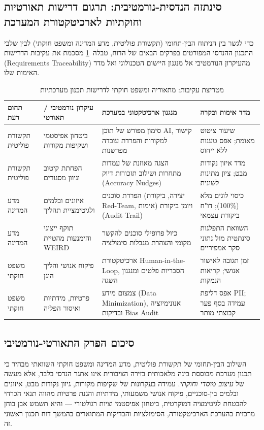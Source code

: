 \subsection{סינתזה הנדסית-נורמטיבית: תרגום דרישות תאורטיות וחוקתיות לארכיטקטורת המערכת}
כדי לגשר בין הניתוח הבין-תחומי (תקשורת פוליטית, מדע המדינה ומשפט חוקתי) לבין שלבי התכנון ההנדסי המפורטים בפרקים הבאים של הדוח, טבלה~\ref{tab:design-traceability} מסכמת את עקיבות הדרישות (Requirements Traceability) מהעיקרון הנורמטיבי אל מנגנון היישום הטכנולוגי ואל מדד האימות שלו.

\begin{table}[htbp]
\centering
\caption{מטריצת עקיבות: מתאוריה ומשפט חוקתי לדרישות תכנון מערכתיות}
\label{tab:design-traceability}
\begin{tabular}{|p{2.8cm}|p{3.6cm}|p{4.3cm}|p{3.8cm}|}
\hline
\textbf{תחום דעת} & \textbf{עיקרון נורמטיבי / תאורטי} & \textbf{מנגנון ארכיטקטוני במערכת} & \textbf{מדד אימות ובקרה} \\
\hline
תקשורת פוליטית & ביטחון אפיסטמי ושקיפות מקורות \cite{kreps2022all, lazer2018science} & סימון מפורש של תוכן AI, קישור למקורות והפרדת עובדה מפרשנות & שיעור ציטוט מאומת; אפס טענות ללא ייחוס \\
\hline
תקשורת פוליטית & הפחתת קיטוב וגיוון מסגורים \cite{iyengar2019origins, pennycook2021shifting} & הצגה מאוזנת של עמדות מתחרות ושילוב תזכורות דיוק (Accuracy Nudges) & מדד איזון נקודות מבט; ציון מתינות לשונית \\
\hline
מדע המדינה & איזונים ובלמים ולגיטימציית תהליך \cite{ostrom1990governing, scharpf1999governing} & הפרדת סוכנים (יצירה, ביקורת Red-Team, אימות) ויומן ביקורת (Audit Trail) & כיסוי לוגים מלא (100\%); דו"ח ביקורת עצמאי \\
\hline
מדע המדינה & תוקף ייצוגי והימנעות מהטיית WEIRD \cite{pitkin1967concept, bisbee2024synthetic} & כיול פרופילי סוכנים להקשר מקומי והצהרת מגבלות סימולציה & השוואת התפלגות סינתטית מול נתוני סקר אמפיריים \\
\hline
משפט חוקתי & פיקוח אנושי והליך הוגן \cite{euaiact2024, citron2014scored} & ארכיטקטורת Human-in-the-Loop, הסבריות פלטים ומנגנון השגה & זמן תגובה לאישור אנושי; קריאות הנמקות \\
\hline
משפט חוקתי & פרטיות, מידתיות ואיסור הפליה \cite{barak2012proportionality, barocas2016big} & צמצום מידע (Data Minimization), אנונימיזציה ובדיקות Bias Audit & אפס דליפת PII; עמידה בסף פער קבוצתי מותר \\
\hline
\end{tabular}
\end{table}

\subsection{סיכום הפרק התאורטי-נורמטיבי}
השילוב הבין-תחומי של תקשורת פוליטית, מדע המדינה ומשפט חוקתי השוואתי מבהיר כי תכנון מערכת מבוססת בינה מלאכותית בזירה הציבורית אינו אתגר הנדסי בלבד, אלא מעשה של \emph{עיצוב מוסדי וחוקתי}. עמידה בעקרונות של שקיפות מקורות, גיוון נקודות מבט, איזונים ובלמים בין-סוכניים, פיקוח אנושי משמעותי, מידתיות והגנת פרטיות מהווה תנאי הכרחי להבטחת לגיטימציה דמוקרטית, ביטחון אפיסטמי וציות רגולטורי --- והיא תשמש אבן בוחן מרכזית בהערכת הארכיטקטורה, הסימולציות והבדיקות המתוארים בהמשך דוח תכנון ראשוני זה.
